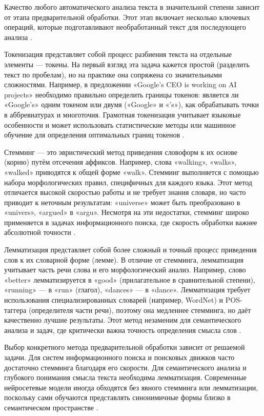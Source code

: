 \documentclass{SibFU-docs}
\begin{document}

Качество любого автоматического анализа текста в значительной степени зависит от этапа предварительной обработки. Этот этап включает несколько ключевых операций, которые подготавливают необработанный текст для последующего анализа \cite{Educative2023Tokenization, BecomingHuman2023NLP}.

Токенизация представляет собой процесс разбиения текста на отдельные элементы — токены. На первый взгляд эта задача кажется простой (разделить текст по пробелам), но на практике она сопряжена со значительными сложностями. Например, в предложении «Google's CEO is working on AI projects» необходимо правильно определить границы токенов: является ли «Google's» одним токеном или двумя («Google» и «'s»), как обрабатывать точки в аббревиатурах и многоточия. Грамотная токенизация учитывает языковые особенности и может использовать статистические методы или машинное обучение для определения оптимальных границ токенов \cite{GeeksforGeeks2024NER}.

Стемминг — это эвристический метод приведения словоформ к их основе (корню) путём отсечения аффиксов. Например, слова «walking», «walks», «walked» приводятся к общей форме «walk». Стемминг выполняется с помощью набора морфологических правил, специфичных для каждого языка. Этот метод отличается высокой скоростью работы и не требует знания словаря, но часто приводит к неточным результатам: «universe» может быть преобразовано в «univers», «argued» в «argu». Несмотря на эти недостатки, стемминг широко применяется в задачах информационного поиска, где скорость обработки важнее абсолютной точности \cite{Educative2023Tokenization}.

Лемматизация представляет собой более сложный и точный процесс приведения слов к их словарной форме (лемме). В отличие от стемминга, лемматизация учитывает часть речи слова и его морфологический анализ. Например, слово «better» лемматизируется в «good» (прилагательное в сравнительной степени), «running» — в «run» (глагол), «dances» — в «dance». Лемматизация требует использования специализированных словарей (например, WordNet) и POS-таггера (определителя части речи), поэтому она медленнее стемминга, но даёт качественно лучшие результаты. Этот метод незаменим для семантического анализа и задач, где критически важна точность определения смысла слов \cite{BecomingHuman2023NLP}.

Выбор конкретного метода предварительной обработки зависит от решаемой задачи. Для систем информационного поиска и поисковых движков часто достаточно стемминга благодаря его скорости. Для семантического анализа и глубокого понимания смысла текста необходима лемматизация. Современные нейросетевые модели иногда обходятся без явного стемминга или лемматизации, поскольку сами обучаются представлять синонимичные формы близко в семантическом пространстве \cite{Coursera2025NLP}.
\end{document}
